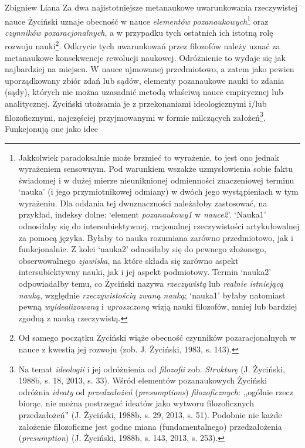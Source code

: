 \begin{artplenv}{Zbigniew Liana}
Za dwa najistotniejsze metanaukowe uwarunkowania rzeczywistej nauce Życiński uznaje obecność w nauce \textit{elementów
	pozanaukowych}\footnote{Jakkolwiek paradoksalnie może brzmieć to wyrażenie, to jest ono jednak wyrażeniem sensownym.
	Pod warunkiem wszakże uzmysłowienia sobie faktu świadomej i w dużej mierze nieuniknionej odmienności znaczeniowej
	terminu ‘nauka’ (i jego przymiotnikowej odmiany) w dwóch jego wystąpieniach w tym wyrażeniu. Dla oddania tej
	dwuznaczności należałoby zastosować, na przykład, indeksy dolne: ‘element \textit{pozanaukowy1} w \textit{nauce2}’.
	‘Nauka1’ odnosiłaby się do intersubiektywnej, racjonalnej rzeczywistości artykułowalnej za pomocą języka. Byłaby to
	nauka rozumiana zarówno przedmiotowo, jak i funkcjonalnie. Z kolei ‘nauka2’ odnosiłaby się do pewnego złożonego,
	obserwowalnego \textit{zjawiska}, na które składa się zarówno aspekt intersubiektywny nauki, jak i jej aspekt podmiotowy.
	Termin ‘nauka2’ odpowiadałby temu, co Życiński nazywa \textit{rzeczywistą }lub\textit{ realnie istniejącą nauką}, względnie
	\textit{rzeczywistością zwaną nauką}; ‘nauka1’ byłaby natomiast pewną \textit{wyidealizowaną} i \textit{uproszczoną }wizją
	nauki filozofów, mniej lub bardziej zgodną z nauką rzeczywistą.} oraz \textit{czynników pozaracjonalnych}, a w
przypadku tych ostatnich ich istotną rolę rozwoju nauki\footnote{Od samego początku Życiński wiąże obecność czynników
	pozaracjonalnych w nauce z kwestią jej rozwoju \label{ref:RNDGwyI8mc6od}(zob. J. Życiński, 1983, s. 143).}. Odkrycie
tych uwarunkowań przez filozofów należy uznać za metanaukowe konsekwencje rewolucji naukowej. Odróżnienie to wydaje się
jak najbardziej na miejscu. W nauce ujmowanej przedmiotowo, a zatem jako pewien uporządkowany zbiór zdań lub sądów,
elementy pozanaukowe nauki to zdania (sądy), których nie można uzasadnić metodą właściwą nauce empirycznej lub
analitycznej. Życiński utożsamia je z przekonaniami ideologicznymi i/lub filozoficznymi, najczęściej przyjmowanymi w
formie milczących założeń\footnote{Na temat \textit{ideologii} i jej odróżnienia od \textit{filozofii} zob.
	\textit{Strukturę} \label{ref:RND65JRx0WUvQ}(J. Życiński, 1988b, s. 18, 2013, s. 33). Wśród elementów pozanaukowych
	Życiński odróżnia \textit{ideaty} od \textit{przedzałożeń} (\textit{presumptions}) \textit{filozoficznych}: ,,ogólnie rzecz
	biorąc, nie można postrzegać ideatów jako wytworu filozoficznych przedzałożeń'' \label{ref:RNDNBJ2x09ZUn}(J. Życiński,
	1988b, s. 29, 2013, s. 51). Podobnie nie każde założenie filozoficzne jest godne miana (fundamentalnego) przedzałożenia
	(\textit{presumption}) \label{ref:RNDKgGZVRdQ4Q}(J. Życiński, 1988b, s. 143, 2013, s. 253).}. Funkcjonują one jako idee

\end{artplenv}
